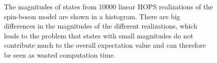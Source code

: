 \begin{figure}[!ht]
    \centering
    \caption{The magnitudes of states from 10000 linear HOPS realizations of the spin-boson model are shown in a histogram. There are
    big differences in the magnitudes of the different realizations, which leads to the problem that states with small magnitudes
    do not contribute much to the overall expectation value and can therefore be seen as wasted computation time.}
    \label{fig:HOPS_linear_magnitudes} 
\end{figure}